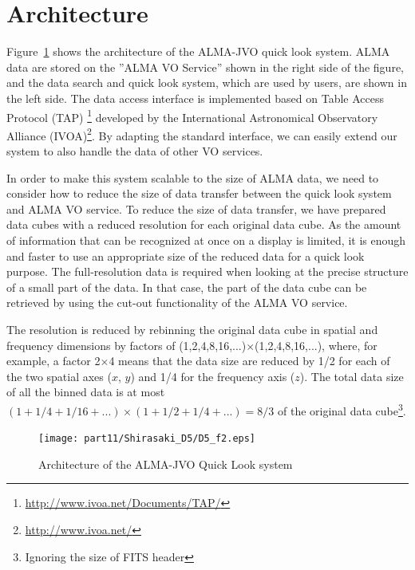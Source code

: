 \section{Architecture}

Figure~\ref{fig:2} shows the architecture of the ALMA-JVO quick look system. ALMA data are stored on the ''ALMA VO Service'' shown in the right side of the figure, and the data search and quick look system, which are used by users, are shown in the left side. The data access interface is implemented based on Table Access Protocol (TAP) \footnote{\url{http://www.ivoa.net/Documents/TAP/}} developed by the International Astronomical Observatory Alliance (IVOA)\footnote{\url{http://www.ivoa.net/}}. By adapting the standard interface, we can easily extend our system to also handle the data of other VO services.

In order to make this system scalable to the size of ALMA data, we need to consider how to reduce the size of data transfer between the quick look system and ALMA VO service. To reduce the size of data transfer, we have prepared data cubes with a reduced resolution for each original data cube. As the amount of information that can be recognized at once on a display  is limited, it is enough and faster to use an appropriate size of the reduced data for a quick look purpose. The full-resolution data is required when looking at the precise structure of a small part of the data. In that case, the part of the data cube can be retrieved by using the cut-out functionality of the ALMA VO service.

The resolution is reduced by rebinning the original data cube in spatial and frequency dimensions by factors of (1,2,4,8,16,...)$\times$(1,2,4,8,16,...), where, for example, a factor 2$\times$4 means that the data size are reduced by 1/2 for each of the two spatial axes ($x$, $y$) and 1/4 for the frequency axis ($z$). The total data size of all the binned data is at most  $(1 + 1/4 + 1/16 + ...) \times (1 + 1/2 + 1/4 + ...) = 8/3$  of the original data cube\footnote{Ignoring the size of FITS header}.


\begin{figure}[t]
\begin{center}
\texttt{[image: part11/Shirasaki\_D5/D5\_f2.eps]}
\caption{Architecture of the ALMA-JVO Quick Look system}
\label{fig:2}
\end{center}
\end{figure}

